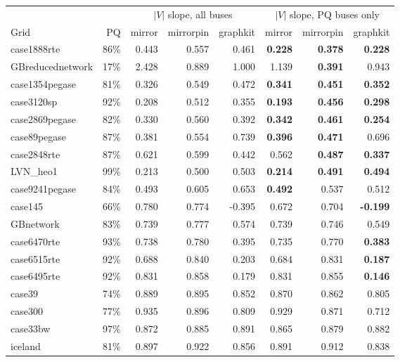 \documentclass[10pt]{article}
\begin{document}
\begin{table}[H]
\centering
\small
\begin{tabular}{lrrrrrrr}
\toprule
 & & \multicolumn{3}{c}{$|V|$ slope, all buses} & \multicolumn{3}{c}{$|V|$ slope, PQ buses only} \\
\cmidrule(lr){3-5}\cmidrule(lr){6-8}
Grid & PQ & mirror & mirrorpin & graphkit & mirror & mirrorpin & graphkit \\
\midrule
case1888rte & 86\% & 0.443 & 0.557 & 0.461 & \textbf{0.228} & \textbf{0.378} & \textbf{0.228} \\
GBreducednetwork & 17\% & 2.428 & 0.889 & 1.000 & 1.139 & \textbf{0.391} & 0.943 \\
case1354pegase & 81\% & 0.326 & 0.549 & 0.472 & \textbf{0.341} & \textbf{0.451} & \textbf{0.352} \\
case3120sp & 92\% & 0.208 & 0.512 & 0.355 & \textbf{0.193} & \textbf{0.456} & \textbf{0.298} \\
case2869pegase & 82\% & 0.330 & 0.560 & 0.392 & \textbf{0.342} & \textbf{0.461} & \textbf{0.254} \\
case89pegase & 87\% & 0.381 & 0.554 & 0.739 & \textbf{0.396} & \textbf{0.471} & 0.696 \\
case2848rte & 87\% & 0.621 & 0.599 & 0.442 & 0.562 & \textbf{0.487} & \textbf{0.337} \\
LVN\_heo1 & 99\% & 0.213 & 0.500 & 0.503 & \textbf{0.214} & \textbf{0.491} & \textbf{0.494} \\
case9241pegase & 84\% & 0.493 & 0.605 & 0.653 & \textbf{0.492} & 0.537 & 0.512 \\
case145 & 66\% & 0.780 & 0.774 & -0.395 & 0.672 & 0.704 & \textbf{-0.199} \\
GBnetwork & 83\% & 0.739 & 0.777 & 0.574 & 0.739 & 0.746 & 0.549 \\
case6470rte & 93\% & 0.738 & 0.780 & 0.395 & 0.735 & 0.770 & \textbf{0.383} \\
case6515rte & 92\% & 0.688 & 0.840 & 0.203 & 0.684 & 0.831 & \textbf{0.187} \\
case6495rte & 92\% & 0.831 & 0.858 & 0.179 & 0.831 & 0.855 & \textbf{0.146} \\
case39 & 74\% & 0.889 & 0.895 & 0.852 & 0.870 & 0.862 & 0.805 \\
case300 & 77\% & 0.935 & 0.896 & 0.809 & 0.929 & 0.871 & 0.712 \\
case33bw & 97\% & 0.872 & 0.885 & 0.891 & 0.865 & 0.879 & 0.882 \\
iceland & 81\% & 0.897 & 0.922 & 0.856 & 0.891 & 0.912 & 0.838 \\

\end{tabular}
\end{table}
\end{document}
